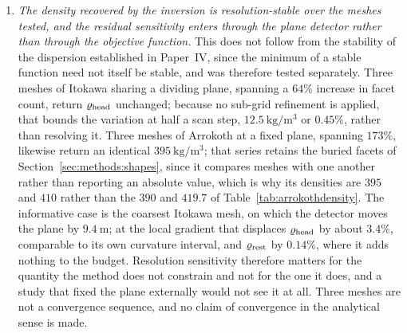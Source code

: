 \begin{enumerate}
\item \emph{The density recovered by the inversion is resolution-stable
over the meshes tested, and the residual sensitivity enters through the
plane detector rather than through the objective function.} This does not
follow from the stability of the dispersion established in Paper~IV,
since the minimum of a stable function need not itself be stable, and was
therefore tested separately. Three meshes of Itokawa sharing a dividing
plane, spanning a $64\%$ increase in facet count, return $\varrho_{\mathrm{head}}$
unchanged; because no sub-grid refinement is applied, that bounds the
variation at half a scan step, $\SI{12.5}{\kilo\gram\per\cubic\metre}$ or
$0.45\%$, rather than resolving it. Three meshes of Arrokoth at a fixed
plane, spanning $173\%$, likewise return an identical
$\SI{395}{\kilo\gram\per\cubic\metre}$; that series retains the buried
facets of Section~\ref{sec:methods:shapes}, since it compares meshes with
one another rather than reporting an absolute value, which is why its
densities are $395$ and $410$ rather than the $390$ and $419.7$ of
Table~\ref{tab:arrokothdensity}. The informative case is the
coarsest Itokawa mesh, on which the detector moves the plane by
$\SI{9.4}{\metre}$; at the local gradient that displaces $\varrho_{\mathrm{head}}$ by
about $3.4\%$, comparable to its own curvature interval, and $\varrho_{\mathrm{rest}}$
by $0.14\%$, where it adds nothing to the budget. Resolution sensitivity
therefore matters for the quantity the method does not constrain and not
for the one it does, and a study that fixed the plane externally would
not see it at all. Three meshes are not a convergence sequence, and no
claim of convergence in the analytical sense is made.


\end{enumerate}
